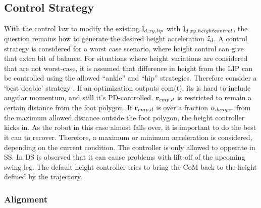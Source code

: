 \subsection{Control Strategy}
With the control law to modify the existing $\dot{\mathbf{l}}_{d,xy,lip}$ with $\dot{\mathbf{l}}_{d,xy,heightcontrol}$, the question remains how to generate the desired height acceleration $\ddot{z}_d$. A control strategy is considered for a worst case scenario, where height control can give that extra bit of balance. For situations where height variations are considered that are not worst-case, it is assumed that difference in height from the \ac{LIP} can be controlled using the allowed ``ankle'' and ``hip'' strategies. Therefore consider a `best doable' strategy . If an optimization outputs com(t), its is hard to include angular momentum, and still it's PD-controlled. 
$\mathbf{r}_{cmp,d}$ is restricted to remain a certain distance from the foot polygon. If $\mathbf{r}_{cmp,d}$ is over a fraction $\alpha_{danger}$ from the maximum allowed distance outside the foot polygon, the height controller kicks in. As the robot in this case almost falls over, it is important to do the best it can to recover. Therefore, a maximum or minimum acceleration is considered, depending on the current condition. The controller is only allowed to opperate in \ac{SS}. In \ac{DS} is observed that it can cause problems with lift-off of the upcoming swing leg. The default height controller tries to bring the \ac{CoM} back to the height defined by the trajectory.  

%
\subsubsection{Alignment}


